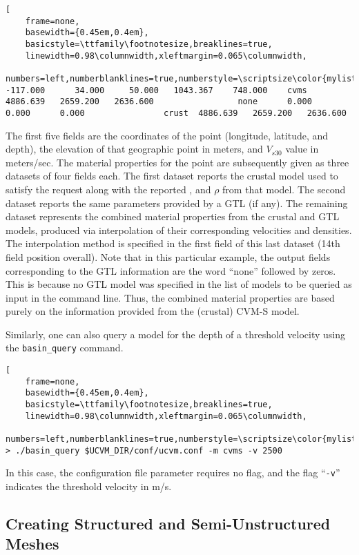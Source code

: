 \begin{lstlisting}[
	frame=none,
	basewidth={0.45em,0.4em},
	basicstyle=\ttfamily\footnotesize,breaklines=true,
	linewidth=0.98\columnwidth,xleftmargin=0.065\columnwidth,
	numbers=left,numberblanklines=true,numberstyle=\scriptsize\color{mylistingnclr}]
-117.000      34.000     50.000   1043.367    748.000    cvms   4886.639   2659.200   2636.600                 none      0.000      0.000      0.000                crust  4886.639   2659.200   2636.600
\end{lstlisting}

The first five fields are the coordinates of the point (longitude, latitude, and depth), the elevation of that geographic point in meters, and $V_{s30}$ value in meters/sec. The material properties for the point are subsequently given as three datasets of four fields each. The first dataset reports the crustal model used to satisfy the request along with the reported \vp{}, \vs{} and $\rho$ from that model. The second dataset reports the same parameters provided by a GTL (if any). The remaining dataset represents the combined material properties from the crustal and GTL models, produced via interpolation of their corresponding velocities and densities. The interpolation method is specified in the first field of this last dataset (14th field position overall). Note that in this particular example, the output fields corresponding to the GTL information are the word ``none'' followed by zeros. This is because no GTL model was specified in the list of models to be queried as input in the command line. Thus, the combined material properties are based purely on the information provided from the (crustal) CVM-S model.

Similarly, one can also query a model for the depth of a threshold velocity using the \texttt{basin\_query} command.

\begin{lstlisting}[
	frame=none,
	basewidth={0.45em,0.4em},
	basicstyle=\ttfamily\footnotesize,breaklines=true,
	linewidth=0.98\columnwidth,xleftmargin=0.065\columnwidth,
	numbers=left,numberblanklines=true,numberstyle=\scriptsize\color{mylistingnclr}]
> ./basin_query $UCVM_DIR/conf/ucvm.conf -m cvms -v 2500
\end{lstlisting}

\noindent
In this case, the configuration file parameter requires no flag, and the flag ``\texttt{-v}'' indicates the threshold \vs{} velocity in m/s.

\subsection{Creating Structured and Semi-Unstructured Meshes}

